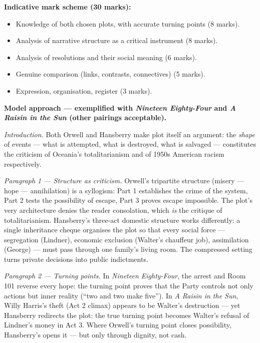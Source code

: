 \documentclass[11pt]{article}
\begin{document}
\begin{corrige}
\textbf{Indicative mark scheme (30 marks):}
\begin{itemize}
\item Knowledge of both chosen plots, with accurate turning points (8 marks).
\item Analysis of narrative structure as a critical instrument (8 marks).
\item Analysis of resolutions and their social meaning (6 marks).
\item Genuine comparison (links, contrasts, connectives) (5 marks).
\item Expression, organisation, register (3 marks).
\end{itemize}

\textbf{Model approach --- exemplified with \emph{Nineteen Eighty-Four} and \emph{A Raisin in the Sun} (other pairings acceptable).}

\emph{Introduction.} Both Orwell and Hansberry make plot itself an argument: the \emph{shape} of events --- what is attempted, what is destroyed, what is salvaged --- constitutes the criticism of Oceania's totalitarianism and of 1950s American racism respectively.

\emph{Paragraph 1 --- Structure as criticism.} Orwell's tripartite structure (misery --- hope --- annihilation) is a syllogism: Part 1 establishes the crime of the system, Part 2 tests the possibility of escape, Part 3 proves escape impossible. The plot's very architecture denies the reader consolation, which \emph{is} the critique of totalitarianism. Hansberry's three-act domestic structure works differently: a single inheritance cheque organises the plot so that every social force --- segregation (Lindner), economic exclusion (Walter's chauffeur job), assimilation (George) --- must pass through one family's living room. The compressed setting turns private decisions into public indictments.

\emph{Paragraph 2 --- Turning points.} In \emph{Nineteen Eighty-Four}, the arrest and Room 101 reverse every hope: the turning point proves that the Party controls not only actions but inner reality (``two and two make five''). In \emph{A Raisin in the Sun}, Willy Harris's theft (Act 2 climax) appears to be Walter's destruction --- yet Hansberry redirects the plot: the true turning point becomes Walter's refusal of Lindner's money in Act 3. Where Orwell's turning point closes possibility, Hansberry's opens it --- but only through dignity, not cash.


\end{corrige}
\end{document}
